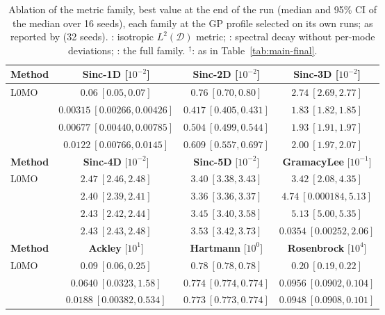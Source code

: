 \begin{table}[!tp]
\centering
\caption{Ablation of the metric family, best value at the end of the run (median and 95\% CI of the median over 16 seeds), each family at the GP profile selected on its own runs; \lzero{} as reported by \citet{sartor2026sparse} (32 seeds). \oursl{}: isotropic $L^2(\mathcal{D})$ metric; \oursd{}: spectral decay without per-mode deviations; \ourss{}: the full family. $^\dagger$: as in Table~\ref{tab:main-final}.}
\label{tab:ablation}
\setlength{\tabcolsep}{3pt}
\footnotesize
\begin{tabular}{lccc}
\toprule
\textbf{Method} & \textbf{Sinc-1D} [$10^{-2}$] & \textbf{Sinc-2D} [$10^{-2}$] & \textbf{Sinc-3D} [$10^{-2}$] \\
\midrule
L0MO & $0.06\ [0.05, 0.07]$ & $0.76\ [0.70, 0.80]$ & $2.74\ [2.69, 2.77]$ \\
\oursl{} & $\mathbf{0.00315\ [0.00266, 0.00426]}$ & $\mathbf{0.417\ [0.405, 0.431]}$ & $\mathbf{1.83\ [1.82, 1.85]}$ \\
\oursd{} & $0.00677\ [0.00440, 0.00785]$ & $0.504\ [0.499, 0.544]$ & $1.93\ [1.91, 1.97]$ \\
\ourss{} & $0.0122\ [0.00766, 0.0145]$ & $0.609\ [0.557, 0.697]$ & $2.00\ [1.97, 2.07]$ \\
\midrule\midrule
\textbf{Method} & \textbf{Sinc-4D} [$10^{-2}$] & \textbf{Sinc-5D} [$10^{-2}$] & \textbf{GramacyLee} [$10^{-1}$] \\
\midrule
L0MO & $2.47\ [2.46, 2.48]$ & $3.40\ [3.38, 3.43]$ & $3.42\ [2.08, 4.35]$ \\
\oursl{} & $\mathbf{2.40\ [2.39, 2.41]}$ & $\mathbf{3.36\ [3.36, 3.37]}$ & $\mathbf{4.74\ [0.000184, 5.13]}$ \\
\oursd{} & $2.43\ [2.42, 2.44]$ & $3.45\ [3.40, 3.58]$ & $5.13\ [5.00, 5.35]$ \\
\ourss{} & $2.43\ [2.43, 2.48]$ & $3.53\ [3.42, 3.73]$ & $\mathbf{0.0354\ [0.00252, 2.06]}$ \\
\midrule\midrule
\textbf{Method} & \textbf{Ackley} [$10^{1}$] & \textbf{Hartmann} [$10^{0}$] & \textbf{Rosenbrock} [$10^{4}$] \\
\midrule
L0MO & $0.09\ [0.06, 0.25]$ & $0.78\ [0.78, 0.78]$ & $0.20\ [0.19, 0.22]$ \\
\oursl{} & $0.0640\ [0.0323, 1.58]$ & $0.774\ [0.774, 0.774]$ & $0.0956\ [0.0902, 0.104]$ \\
\oursd{} & $\mathbf{0.0188\ [0.00382, 0.534]}$ & $\mathbf{0.773\ [0.773, 0.774]}$ & $0.0948\ [0.0908, 0.101]$ \\

\end{tabular}
\end{table}
